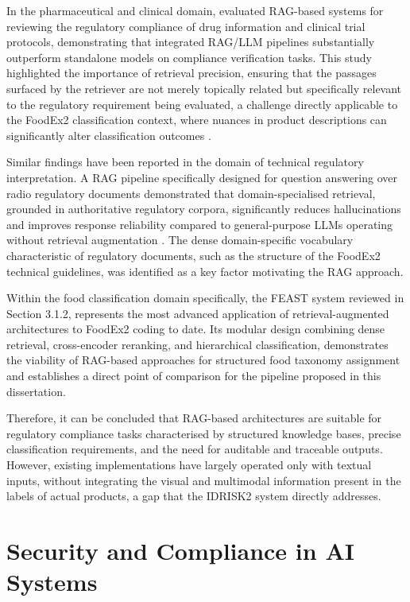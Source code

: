 In the pharmaceutical and clinical domain, \textcite{waikar_rag_2026} evaluated RAG-based systems for reviewing the regulatory compliance of drug information and clinical trial protocols, demonstrating that integrated RAG/LLM pipelines substantially outperform standalone models on compliance verification tasks. This study highlighted the importance of retrieval precision, ensuring that the passages surfaced by the retriever are not merely topically related but specifically relevant to the regulatory requirement being evaluated, a challenge directly applicable to the FoodEx2 classification context, where nuances in product descriptions can significantly alter classification outcomes \parencite{hocine_kadi_3530c912,milad_moradi_83875958}.

Similar findings have been reported in the domain of technical regulatory interpretation. A RAG pipeline specifically designed for question answering over radio regulatory documents demonstrated that domain-specialised retrieval, grounded in authoritative regulatory corpora, significantly reduces hallucinations and improves response reliability compared to general-purpose LLMs operating without retrieval augmentation \parencite{kassimi__zakaria_el_f3c1dbe2}. The dense domain-specific vocabulary characteristic of regulatory documents, such as the structure of the FoodEx2 technical guidelines, was identified as a key factor motivating the RAG approach.

Within the food classification domain specifically, the FEAST system \parencite{lorenzo_molfetta_47d7c4cd} reviewed in Section 3.1.2, represents the most advanced application of retrieval-augmented architectures to FoodEx2 coding to date. Its modular design combining dense retrieval, cross-encoder reranking, and hierarchical classification, demonstrates the viability of RAG-based approaches for structured food taxonomy assignment and establishes a direct point of comparison for the pipeline proposed in this dissertation.

Therefore, it can be concluded that RAG-based architectures are suitable for regulatory compliance tasks characterised by structured knowledge bases, precise classification requirements, and the need for auditable and traceable outputs. However, existing implementations have largely operated only with textual inputs, without integrating the visual and multimodal information present in the labels of actual products, a gap that the IDRISK2 system directly addresses.

\hypertarget{security-and-compliance-in-ai-systems}{%
\section{Security and Compliance in AI Systems}\label{security-and-compliance-in-ai-systems}}

